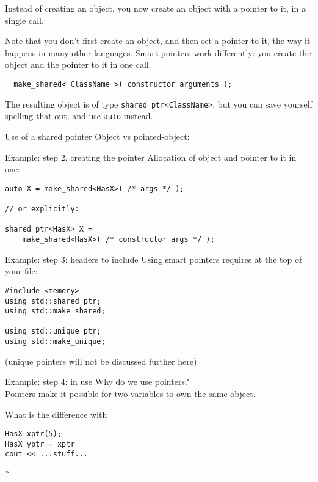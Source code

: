 Instead of creating an object, you now create an object with a pointer to it,
in a single call.

Note that you don't first create an object, and then set a pointer to it,
the way it happens in many other languages.
Smart pointers work differently:
you create the object and the pointer to it in one call.
\begin{lstlisting}
  make_shared< ClassName >( constructor arguments );
\end{lstlisting}
The resulting object is of type \lstinline+shared_ptr<ClassName>+,
but you can save yourself spelling that out, and use \lstinline{auto}
instead.

\begin{block}{Use of a shared pointer}
  \label{sl:use-shared}
Object vs pointed-object:
\end{block}

\begin{slide}{Example: step 2, creating the pointer}
  \label{sl:make-shared}
  Allocation of object and pointer to it in one:
\begin{lstlisting}
auto X = make_shared<HasX>( /* args */ );

// or explicitly:

shared_ptr<HasX> X =
    make_shared<HasX>( /* constructor args */ );
\end{lstlisting}
\end{slide}

\begin{plainblock}{Example: step 3: headers to include}
  \label{sl:pointer-header}
  Using smart pointers requires at the top of your file:
\begin{lstlisting}
#include <memory>
using std::shared_ptr;
using std::make_shared;

using std::unique_ptr;
using std::make_unique;
\end{lstlisting}
\begin{322}
  (unique pointers will not be discussed further here)
\end{322}
\end{plainblock}

\begin{block}{Example: step 4: in use}
  \label{sl:pointwhy}
  Why do we use pointers?\\
  Pointers make it possible for two variables to own the same object.
\begin{322}
  What is the difference with
\begin{lstlisting}
HasX xptr(5);
HasX yptr = xptr
cout << ...stuff...
\end{lstlisting}
?
\end{322}
\end{block}

